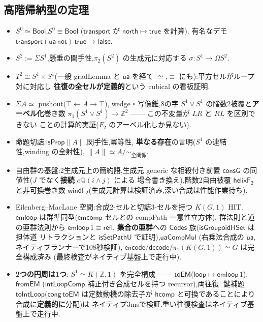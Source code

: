 \documentclass[11pt]{ltjsarticle}
\newcommand{\Z}{\mathbb{Z}}
\newcommand{\op}[1]{\ensuremath{\mathsf{#1}}}
\begin{document}
\subsection{高階帰納型の定理}
\begin{itemize}[leftmargin=1.5em]
\item $S^0\simeq\op{Bool}$,$S^0\equiv\op{Bool}$
($\op{transport}$ が $\op{north}\mapsto\op{true}$ を計算).
有名なデモ $\op{transport}(\op{ua}\,\op{not})\,\op{true}\longrightarrow
\op{false}$.
\item $S^2:=\Sigma S^1$,懸垂の関手性,$\pi_2(S^2)$ の生成元に対応する
$\sigma:S^1\to\Omega S^2$.
\item $T^2\cong S^1\times S^1$(一般 gradLemma と $\op{ua}$ を経て
$\simeq$,$\equiv$ にも):平方セルがループ対に対応し
\textbf{往復の全セルが定義的}という cubical の看板証明.
\item $\Sigma A\simeq$ pushout($\top\leftarrow A\rightarrow\top$),
wedge・写像錐,8の字 $S^1\vee S^1$ の階数2被覆と\textbf{アーベル化}巻き数
$\pi_1(S^1{\vee}S^1)\to\Z^2$ —— この不変量が $LR$ と $RL$ を区別できない
ことの計算的実証($F_2$ のアーベル化しか見ない).
\item 命題切詰:$\op{isProp}\lVert A\rVert$,関手性,冪等性,
\textbf{単なる存在}の言明($S^1$ の連結性,winding の全射性),
$\lVert A\rVert\simeq A/\!\sim_{\text{全関係}}$.
\item 自由群の基盤:2生成元上の簡約語,生成元 generic な相殺付き前置
$\op{consG}$ の同値性($J$ でなく\textbf{接続} $e@(i\wedge j)$ による
場合書き換え),階数2自由被覆 $\op{helixF_2}$ と非可換巻き数
$\op{windF_2}$(生成元計算は検証済み,深い合成は性能作業待ち).
\item Eilenberg--MacLane 空間:合成2-セルと切詰3-セルを持つ $K(G,1)$ HIT.
$\op{emloop}$ は群準同型($\op{emcomp}$ セルとの compPath 一意性立方体),
群法則と道の亜群法則から $\op{emloop}\,1\equiv\op{refl}$,
\textbf{集合の亜群}への $\op{Codes}$ 族($\op{isGroupoidHSet}$ は担体道
リトラクションと $\op{isSetPathU}$ で証明),$\op{uaCompMul}$
(右乗法合成の $\op{ua}$,ネイティブランナーで108秒検証),
$\op{encode}$/$\op{decode}$/$\pi_1(K(G,1))\simeq G$ は完全構成済み
(最終検査がネイティブ基盤上で走行中).
\item \textbf{2つの円周は1つ}: $S^1\simeq K(\Z,1)$ を完全構成 ——
$\op{toEM}$($\op{loop}\mapsto\op{emloop}\,1$),$\op{fromEM}$
($\op{intLoopComp}$ 補正付き合成セルを持つ recursor),両往復.
鍵補題 $\op{toIntLoop}$($\op{cong}\,\op{toEM}$ は定数動機の除去子が
$\op{hcomp}$ と可換であることにより合成に\textbf{定義的に}分配)は
ネイティブ3msで検証.重い往復検査はネイティブ基盤上で走行中.
\end{itemize}
\end{document}
